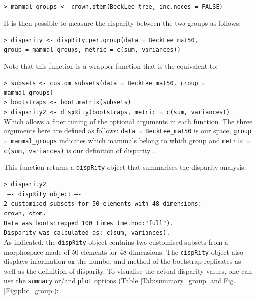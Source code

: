 \documentclass[12pt,letterpaper]{article}
\newcommand{\disp}{\texttt{dispRity} }
\begin{document}
\noindent
\texttt{> mammal\_groups <- crown.stem(BeckLee\_tree, inc.nodes = FALSE)}

\noindent It is then possible to measure the disparity between the two groups as follows:

\noindent
\texttt{> disparity <- dispRity.per.group(data = BeckLee\_mat50,}\\
\texttt{group = mammal\_groups, metric = c(sum, variances))}

\noindent Note that this function is a wrapper function that is the equivalent to:

\noindent
\texttt{> subsets <- custom.subsets(data = BeckLee\_mat50, group = mammal\_groups)}\\
\noindent
\texttt{> bootstraps <- boot.matrix(subsets)}\\
\noindent
\texttt{> disparity2 <- dispRity(bootstraps, metric = c(sum, variances))}\\

\noindent Which allows a finer tuning of the optional arguments in each function.
The three arguments here are defined as follows: \texttt{data = BeckLee\_mat50} is our space, \texttt{group = mammal\_groups} indicates which mammals belong to which group and \texttt{metric = c(sum, variances)} is our definition of disparity \citep{foote1991morphological,Wills1994,Ciampaglio2001}. 

This function returns a \disp object that summarises the disparity analysis:

\noindent \texttt{> disparity2}\\
\noindent \texttt{ ---- dispRity object ---- }\\
\noindent \texttt{2 customised subsets for 50 elements with 48 dimensions:}\\
          \texttt{crown, stem.}\\
\noindent \texttt{Data was bootstrapped 100 times (method:"full").}\\
\noindent \texttt{Disparity was calculated as: c(sum, variances).}\\

\bigskip
As indicated, the \disp object contains two customised subsets from a morphospace made of 50 elements for 48 dimensions.
The \disp object also displays information on the number and method of the bootstrap replicates as well as the definition of disparity.
To visualise the actual disparity values, one can use the \texttt{summary} or/and \texttt{plot} options (Table \ref{Tab:summary_group} and Fig. \ref{Fig:plot_group}):
\end{document}
